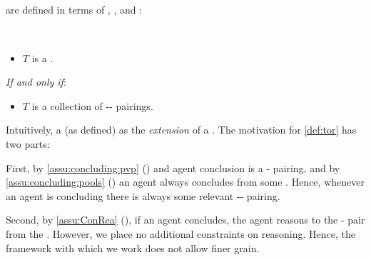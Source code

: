 \subsection{}
\label{cha:typical:tCDef:ToRdef}

\begin{note}
   are defined in terms of , , and :

  \begin{definition}[\torN{2}]
    \label{def:tor}
    \mbox{ }
    \vspace{-\baselineskip}
    \begin{itemize}
    \item
      \(T\) is a \torN{}.
    \end{itemize}

    \emph{If and only if}:

    \begin{itemize}
    \item
      \(T\) is a collection of -- pairings.
    \end{itemize}
    \vspace{-\baselineskip}
  \end{definition}

  \noindent%
  Intuitively, a \torN{} (as defined) as the \emph{extension} of a \torN{}.
  The motivation for \autoref{def:tor} has two parts:

  First, by \autoref{assu:concluding:pvp} () and agent conclusion is a - pairing, and by \autoref{assu:concluding:pools} () an agent always concludes from some \pool{}.
  Hence, whenever an agent is concluding there is always some relevant -- pairing.

  Second, by \autoref{assu:ConRea} (), if an agent concludes, the agent reasons to the - pair from the .
  However, we place no additional constraints on reasoning.
  Hence, the framework with which we work does not allow finer grain.
\end{note}

